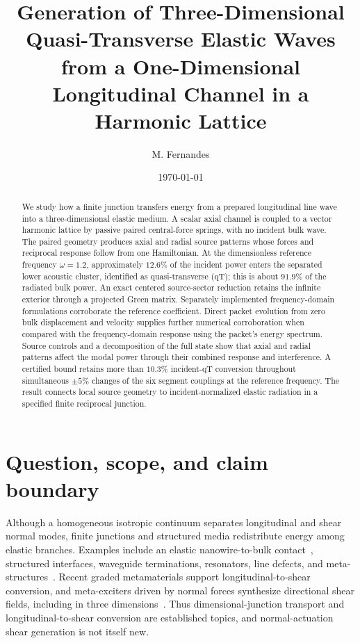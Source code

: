 \documentclass[10pt,aps,pre,reprint,floatfix,notitlepage,nofootinbib]{revtex4-2}
\begin{document}
\title{Generation of Three-Dimensional Quasi-Transverse Elastic Waves from a One-Dimensional Longitudinal Channel in a Harmonic Lattice}
\author{M. Fernandes}
\date{\today}

\begin{abstract}
We study how a finite junction transfers energy from a prepared longitudinal line wave into a three-dimensional elastic medium. A scalar axial channel is coupled to a vector harmonic lattice by passive paired central-force springs, with no incident bulk wave. The paired geometry produces axial and radial source patterns whose forces and reciprocal response follow from one Hamiltonian. At the dimensionless reference frequency $\omega=1.2$, approximately $12.6\%$ of the incident power enters the separated lower acoustic cluster, identified as quasi-transverse (qT); this is about $91.9\%$ of the radiated bulk power. An exact centered source-sector reduction retains the infinite exterior through a projected Green matrix. Separately implemented frequency-domain formulations corroborate the reference coefficient. Direct packet evolution from zero bulk displacement and velocity supplies further numerical corroboration when compared with the frequency-domain response using the packet's energy spectrum. Source controls and a decomposition of the full state show that axial and radial patterns affect the modal power through their combined response and interference. A certified bound retains more than $10.3\%$ incident-qT conversion throughout simultaneous $\pm5\%$ changes of the six segment couplings at the reference frequency. The result connects local source geometry to incident-normalized elastic radiation in a specified finite reciprocal junction.
\end{abstract}
\maketitle

\section{Question, scope, and claim boundary}
\label{sec:scope}

Although a homogeneous isotropic continuum separates longitudinal and shear normal modes, finite junctions and structured media redistribute energy among elastic branches. Examples include an elastic nanowire-to-bulk contact~\cite{ChangGeller2005}, structured interfaces, waveguide terminations, resonators, line defects, and meta-structures~\cite{ZulKarnain2020,Chaplain2020,NievesSharma2024,Clark2025,DalPoggetto2025}. Recent graded metamaterials support longitudinal-to-shear conversion, and meta-exciters driven by normal forces synthesize directional shear fields, including in three dimensions~\cite{Boddapati2026Graded,Liang2026MetaExcitation,Lu2026ThreeDimensional}. Thus dimensional-junction transport and longitudinal-to-shear conversion are established topics, and normal-actuation shear generation is not itself new.
\end{document}
